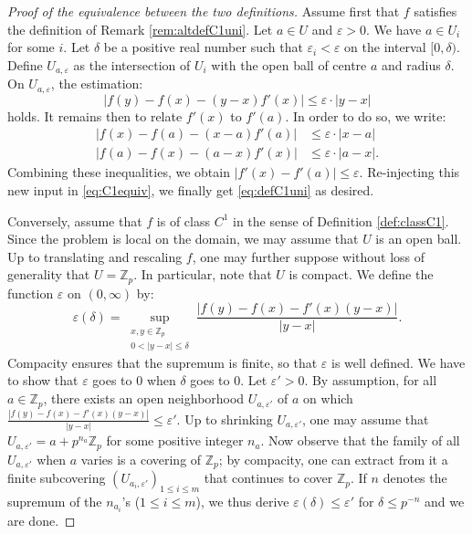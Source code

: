 \documentclass[11pt]{article}
\numberwithin{equation}{section}
\numberwithin{figure}{section}
\renewcommand{\leq}{\leqslant}
\theoremstyle{definition}
\newcommand{\Z}{\mathbb Z}
\newcommand{\Zp}{\Z_p}
\begin{document}
\begin{proof}[Proof of the equivalence between the two definitions]
Assume first that $f$ satisfies the definition of Remark
\ref{rem:altdefC1uni}. Let $a \in U$ and $\varepsilon > 0$. We have
$a \in U_i$ for some $i$. Let $\delta$ be a positive real number such 
that $\varepsilon_i < \varepsilon$ on the interval $[0, \delta)$.
Define $U_{a, \varepsilon}$ as the intersection of $U_i$ with the
open ball of centre $a$ and radius $\delta$. On $U_{a,\varepsilon}$,
the estimation:
\begin{equation}
\label{eq:C1equiv}
\big|f(y) - f(x) - (y{-}x) f'(x)\big| \leq  \varepsilon \cdot 
|y{-}x|
\end{equation}
holds. It remains then to relate $f'(x)$ to $f'(a)$. In order to
do so, we write:
\begin{align*}
\big|f(x) - f(a) - (x{-}a) f'(a)\big| & \leq \varepsilon\cdot |x{-}a| \\
\big|f(a) - f(x) - (a{-}x) f'(x)\big| & \leq \varepsilon\cdot |a{-}x|.
\end{align*}
Combining these inequalities, we obtain $|f'(x) - f'(a)| \leq 
\varepsilon$. Re-injecting this new input in \eqref{eq:C1equiv}, 
we finally get \eqref{eq:defC1uni} as desired.

Conversely, assume that $f$ is of class $C^1$ in the sense of Definition
\ref{def:classC1}. Since the problem is local on the domain, we may
assume that $U$ is an open ball. Up to translating and rescaling $f$,
one may further suppose without loss of generality that $U = \Zp$. In
particular, note that $U$ is compact. We define the function 
$\varepsilon$ on $(0,\infty)$ by:
$$\varepsilon(\delta) = \sup_{\substack{x,y \in \Zp \\ 0 < |y{-}x| \leq
\delta}} \frac{|f(y)-f(x)-f'(x)(y{-}x)|}{|y{-}x|}.$$
Compacity ensures that the supremum is finite, so that $\varepsilon$
is well defined. We have to show that $\varepsilon$ goes to $0$ when 
$\delta$ goes to $0$. Let $\varepsilon' > 0$. By assumption, for all
$a \in \Zp$, there exists an open neighborhood $U_{a,\varepsilon'}$ of 
$a$ on which $\frac{|f(y)-f(x)-f'(x)(y{-}x)|}{|y{-}x|} \leq \varepsilon'$.
Up to shrinking $U_{a,\varepsilon'}$, one may assume that
$U_{a,\varepsilon'} = a + p^{n_a} \Zp$ for some positive integer $n_a$.
Now observe that the family of all $U_{a,\varepsilon'}$ when $a$ varies 
is a covering of $\Zp$; by compacity, one can extract from it a finite 
subcovering $(U_{a_i,\varepsilon'})_{1 \leq i \leq m}$ that continues 
to cover $\Zp$. If $n$ denotes the supremum of the $n_{a_i}$'s ($1 
\leq i \leq m$), we thus derive $\varepsilon(\delta) \leq \varepsilon'$
for $\delta \leq p^{-n}$ and we are done.
\end{proof}
\end{document}
